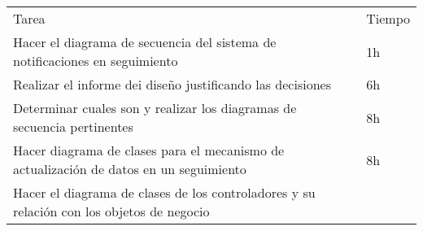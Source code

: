 \begin{enumerate}
  \begin{longtable}[c]{@{}ll@{}}
  \hline\noalign{\medskip}
  \begin{minipage}[b]{0.92\columnwidth}\raggedright
  Tarea
  \end{minipage} & \begin{minipage}[b]{0.08\columnwidth}\raggedright
  Tiempo
  \end{minipage}
  \\\noalign{\medskip}
  \hline\noalign{\medskip}
  \begin{minipage}[t]{0.92\columnwidth}\raggedright
  Hacer el diagrama de secuencia del sistema de notificaciones en
  seguimiento
  \end{minipage} & \begin{minipage}[t]{0.08\columnwidth}\raggedright
  1h
  \end{minipage}
  \\\noalign{\medskip}
  \begin{minipage}[t]{0.92\columnwidth}\raggedright
  Realizar el informe dei diseño justificando las decisiones
  \end{minipage} & \begin{minipage}[t]{0.08\columnwidth}\raggedright
  6h
  \end{minipage}
  \\\noalign{\medskip}
  \begin{minipage}[t]{0.92\columnwidth}\raggedright
  Determinar cuales son y realizar los diagramas de secuencia
  pertinentes
  \end{minipage} & \begin{minipage}[t]{0.08\columnwidth}\raggedright
  8h
  \end{minipage}
  \\\noalign{\medskip}
  \begin{minipage}[t]{0.92\columnwidth}\raggedright
  Hacer diagrama de clases para el mecanismo de actualización de datos
  en un seguimiento
  \end{minipage} & \begin{minipage}[t]{0.08\columnwidth}\raggedright
  8h
  \end{minipage}
  \\\noalign{\medskip}
  \begin{minipage}[t]{0.92\columnwidth}\raggedright
  Hacer el diagrama de clases de los controladores y su relación con los
  objetos de negocio
  \end{minipage} & \begin{minipage}[t]{0.08\columnwidth}\raggedright

\end{minipage}
\end{longtable}
\end{enumerate}
